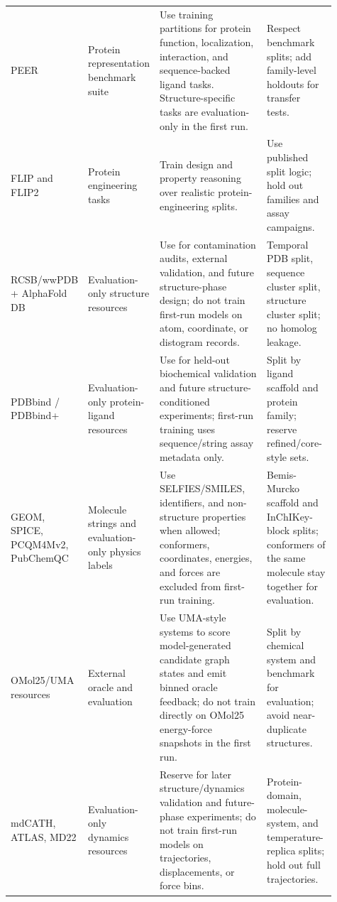 \documentclass[11pt]{article}
\newcommand{\1}{\mathbf{1}}
\begin{document}
{\begin{longtable}{p{0.17\linewidth}p{0.16\linewidth}p{0.36\linewidth}p{0.22\linewidth}}
PEER \cite{PEER2022} & Protein representation benchmark suite & Use training partitions for protein function, localization, interaction, and sequence-backed ligand tasks. Structure-specific tasks are evaluation-only in the first run. & Respect benchmark splits; add family-level holdouts for transfer tests. \\
FLIP and FLIP2 \cite{FLIP2021,FLIP2_2026} & Protein engineering tasks & Train design and property reasoning over realistic protein-engineering splits. & Use published split logic; hold out families and assay campaigns. \\
RCSB/wwPDB + AlphaFold DB \cite{RCSBPDB2026,wwPDB2026,AlphaFoldDB2026} & Evaluation-only structure resources & Use for contamination audits, external validation, and future structure-phase design; do not train first-run models on atom, coordinate, or distogram records. & Temporal PDB split, sequence cluster split, structure cluster split; no homolog leakage. \\
PDBbind / PDBbind+ \cite{PDBbind2021,PDBbindPlus2026} & Evaluation-only protein-ligand resources & Use for held-out biochemical validation and future structure-conditioned experiments; first-run training uses sequence/string assay metadata only. & Split by ligand scaffold and protein family; reserve refined/core-style sets. \\
GEOM, SPICE, PCQM4Mv2, PubChemQC \cite{AxelrodGEOM2022,EastmanSPICE2023,PCQM4Mv2,PubChemQC2023} & Molecule strings and evaluation-only physics labels & Use SELFIES/SMILES, identifiers, and non-structure properties when allowed; conformers, coordinates, energies, and forces are excluded from first-run training. & Bemis-Murcko scaffold and InChIKey-block splits; conformers of the same molecule stay together for evaluation. \\
OMol25/UMA resources \cite{LevineOMol25_2025,WoodUMA2025} & External oracle and evaluation & Use UMA-style systems to score model-generated candidate graph states and emit binned oracle feedback; do not train directly on OMol25 energy-force snapshots in the first run. & Split by chemical system and benchmark for evaluation; avoid near-duplicate structures. \\
mdCATH, ATLAS, MD22 \cite{MirarchiMdCATH2024,VanderMeerscheATLAS2024,MD22_2022} & Evaluation-only dynamics resources & Reserve for later structure/dynamics validation and future-phase experiments; do not train first-run models on trajectories, displacements, or force bins. & Protein-domain, molecule-system, and temperature-replica splits; hold out full trajectories. \\

\end{longtable}}
\end{document}
